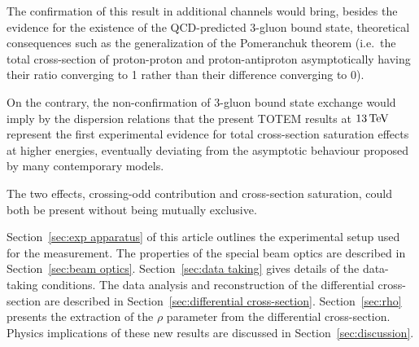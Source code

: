The confirmation of this result in additional channels would bring, besides the evidence for the existence of the QCD-predicted 3-gluon bound state, theoretical consequences such as the generalization of the Pomeranchuk theorem (i.e.~the total cross-section of proton-proton and proton-antiproton asymptotically having their ratio converging to 1 rather than their difference converging to 0).

On the contrary, the non-confirmation of 3-gluon bound state exchange would imply by the dispersion relations that the present TOTEM results at $13\,{\rm TeV}$ represent the first experimental evidence for total cross-section saturation effects at higher energies, eventually deviating from the asymptotic behaviour proposed by many contemporary models.

The two effects, crossing-odd contribution and cross-section saturation, could both be present without being mutually exclusive.

Section~\ref{sec:exp apparatus} of this article outlines the experimental setup used for the measurement. The properties of the special beam optics are described in Section~\ref{sec:beam optics}. Section~\ref{sec:data taking} gives details of the data-taking conditions. The data analysis and reconstruction of the differential cross-section are described in Section~\ref{sec:differential cross-section}. Section~\ref{sec:rho} presents the extraction of the $\rho$ parameter from the differential cross-section. Physics implications of these new results are discussed in Section~\ref{sec:discussion}.
